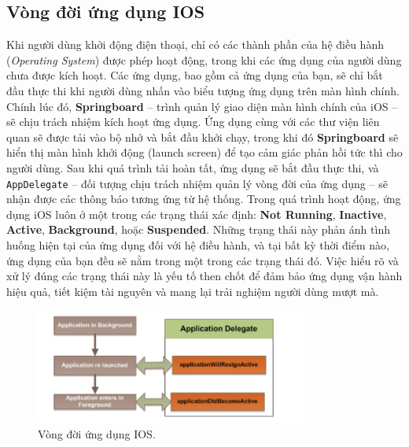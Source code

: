    \subsection{ Vòng đời ứng dụng IOS}	
        \begin{flushleft}
            Khi người dùng khởi động điện thoại, chỉ có các thành phần của hệ điều hành (\textit{Operating System}) được phép hoạt động, trong khi các ứng dụng của người dùng chưa được kích hoạt. Các ứng dụng, bao gồm cả ứng dụng của bạn, sẽ chỉ bắt đầu thực thi khi người dùng nhấn vào biểu tượng ứng dụng trên màn hình chính. Chính lúc đó, \textbf{Springboard} – trình quản lý giao diện màn hình chính của iOS – sẽ chịu trách nhiệm kích hoạt ứng dụng. Ứng dụng cùng với các thư viện liên quan sẽ được tải vào bộ nhớ và bắt đầu khởi chạy, trong khi đó \textbf{Springboard} sẽ hiển thị màn hình khởi động (launch screen) để tạo cảm giác phản hồi tức thì cho người dùng. Sau khi quá trình tải hoàn tất, ứng dụng sẽ bắt đầu thực thi, và \texttt{AppDelegate} – đối tượng chịu trách nhiệm quản lý vòng đời của ứng dụng 
            – sẽ nhận được các thông báo tương ứng từ hệ thống.
            Trong quá trình hoạt động, ứng dụng iOS luôn ở một trong các trạng thái xác định: \textbf{Not Running}, \textbf{Inactive}, \textbf{Active}, \textbf{Background}, hoặc \textbf{Suspended}. Những trạng thái này phản ánh tình huống hiện tại của ứng dụng đối với hệ điều hành, và tại bất kỳ thời điểm nào, ứng dụng của bạn đều sẽ nằm trong một trong các trạng thái đó. Việc hiểu rõ và xử lý đúng các trạng thái này là yếu tố then chốt để đảm bảo ứng dụng vận hành hiệu quả, tiết kiệm tài nguyên và mang lại trải nghiệm người dùng mượt mà.
            
        \end{flushleft}
        \begin{figure}[H] %
            \centering
            \includegraphics[width=0.8\textwidth]{images/vongdoiios.png}
             \caption{Vòng đời ứng dụng IOS\cite{life cycle-IOS}.} 
            \label{fig:vongdoiios}
        \end{figure}
